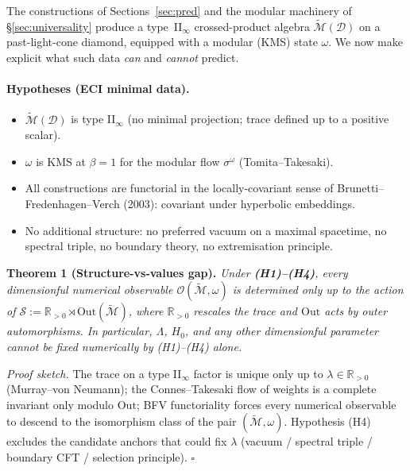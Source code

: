 \documentclass[reprint,amsmath,amssymb,aps,prd,superscriptaddress]{revtex4-2}
\providecommand{\1}{\mathbf{1}}
\begin{document}
The constructions of Sections~\ref{sec:pred} and the modular machinery of
\S\ref{sec:universality} produce a type~II$_\infty$ crossed-product algebra
$\widetilde{\mathcal{M}}(\mathcal{D})$ on a past-light-cone diamond, equipped
with a modular (KMS) state $\omega$. We now make explicit what such data
\emph{can} and \emph{cannot} predict.

\paragraph{Hypotheses (ECI minimal data).}
\begin{itemize}
  \item[\textbf{(H1)}] $\widetilde{\mathcal{M}}(\mathcal{D})$ is type
        II$_\infty$ (no minimal projection; trace defined up to a
        positive scalar).
  \item[\textbf{(H2)}] $\omega$ is KMS at $\beta=1$ for the modular
        flow $\sigma^{\omega}$ (Tomita--Takesaki).
  \item[\textbf{(H3)}] All constructions are functorial in the
        locally-covariant sense of Brunetti--Fredenhagen--Verch (2003):
        covariant under hyperbolic embeddings.
  \item[\textbf{(H4)}] No additional structure: no preferred vacuum
        on a maximal spacetime, no spectral triple, no boundary
        theory, no extremisation principle.
\end{itemize}

\smallskip\noindent\textbf{Theorem 1 (Structure-vs-values gap).}\label{thm:scope}
\emph{Under \textbf{(H1)--(H4)}, every dimensionful numerical observable
$\mathcal{O}(\widetilde{\mathcal{M}},\omega)$ is determined only up
to the action of
$\mathcal{S} := \mathbb{R}_{>0} \rtimes \mathrm{Out}(\widetilde{\mathcal{M}})$,
where $\mathbb{R}_{>0}$ rescales the trace and $\mathrm{Out}$ acts by
outer automorphisms. In particular, $\Lambda$, $H_0$, and any other dimensionful
parameter cannot be fixed numerically by (H1)--(H4) alone.}

\smallskip\noindent\textit{Proof sketch.}
The trace on a type II$_\infty$ factor is unique only up to
$\lambda \in \mathbb{R}_{>0}$ (Murray--von Neumann); the
Connes--Takesaki flow of weights is a complete invariant only modulo
$\mathrm{Out}$; BFV functoriality forces every numerical observable
to descend to the isomorphism class of the pair
$(\widetilde{\mathcal{M}},\omega)$. Hypothesis (H4) excludes the
candidate anchors that could fix $\lambda$ (vacuum / spectral triple
/ boundary CFT / selection principle). \hfill$\square$
\end{document}
